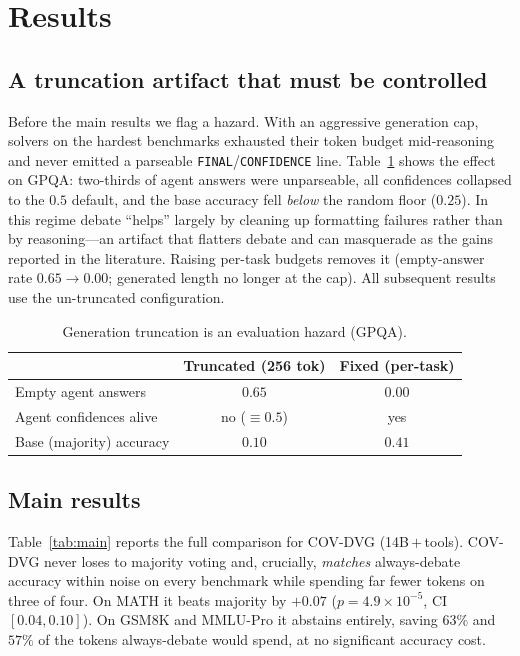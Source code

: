 \documentclass[conference]{IEEEtran}
\begin{document}
\section{Results}
\label{sec:results}

\subsection{A truncation artifact that must be controlled}
\label{sec:trunc}
Before the main results we flag a hazard. With an aggressive generation cap, solvers
on the hardest benchmarks exhausted their token budget mid-reasoning and never emitted
a parseable \texttt{FINAL}/\texttt{CONFIDENCE} line. Table~\ref{tab:trunc} shows the
effect on GPQA: two-thirds of agent answers were unparseable, all confidences collapsed
to the $0.5$ default, and the base accuracy fell \emph{below} the random floor
($0.25$). In this regime debate ``helps'' largely by cleaning up formatting failures
rather than by reasoning---an artifact that flatters debate and can masquerade as the
gains reported in the literature. Raising per-task budgets removes it (empty-answer rate
$0.65\!\rightarrow\!0.00$; generated length no longer at the cap). All subsequent
results use the un-truncated configuration.

\begin{table}[!t]
\caption{Generation truncation is an evaluation hazard (GPQA).}
\label{tab:trunc}
\centering
\begin{tabular}{lcc}
\toprule
 & Truncated (256 tok) & Fixed (per-task) \\
\midrule
Empty agent answers      & $0.65$ & $0.00$ \\
Agent confidences alive  & no ($\equiv 0.5$) & yes \\
Base (majority) accuracy & $0.10$ & $0.41$ \\
\bottomrule
\end{tabular}
\end{table}

\subsection{Main results}
Table~\ref{tab:main} reports the full comparison for COV-DVG (14B\,$+$\,tools).
COV-DVG never loses to majority voting and, crucially, \emph{matches} always-debate
accuracy within noise on every benchmark while spending far fewer tokens on three of
four. On MATH it beats majority by $+0.07$ ($p=4.9\times10^{-5}$, CI
$[0.04,0.10]$). On GSM8K and MMLU-Pro it abstains entirely, saving $63\%$ and $57\%$
of the tokens always-debate would spend, at no significant accuracy cost.
\end{document}
